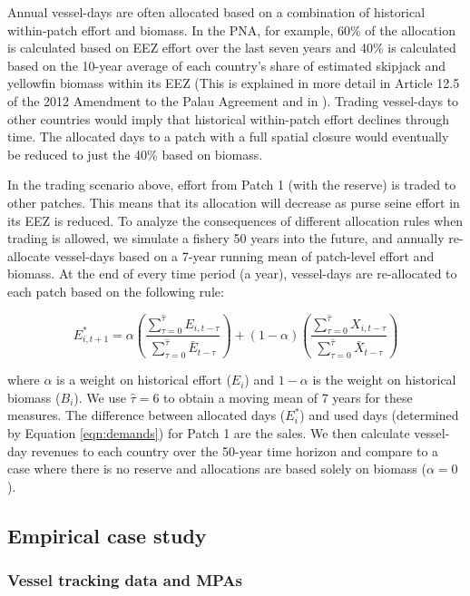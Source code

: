 \documentclass[12pt]{article}
\begin{document}
Annual vessel-days are often allocated based on a combination of historical within-patch effort and biomass. In the PNA, for example, 60\% of the allocation is calculated based on EEZ effort over the last seven years and 40\% is calculated based on the 10-year average of each country’s share of estimated skipjack and yellowfin biomass within its EEZ (This is explained in more detail in Article 12.5 of the 2012 Amendment to the Palau Agreement and in \cite{Hagrannsoknir2014}). Trading vessel-days to other countries would imply that historical within-patch effort declines through time. The allocated days to a patch with a full spatial closure would eventually be reduced to just the 40\% based on biomass.

In the trading scenario above, effort from Patch 1 (with the reserve) is traded to other patches. This means that its allocation will decrease as purse seine effort in its EEZ is reduced. To analyze the consequences of different allocation rules when trading is allowed, we simulate a fishery 50 years into the future, and annually re-allocate vessel-days based on a 7-year running mean of patch-level effort and biomass. At the end of every time period (a year), vessel-days are re-allocated to each patch based on the following rule:

$$
E_{i,t+1}^* = \alpha
\left(\frac{\sum_{\tau = 0}^{\hat{\tau}}E_{i,t-\tau}}{\sum_{\tau = 0}^{\hat{\tau}}\bar{E}_{{t-\tau}}}
	\right)
	+
(1 - \alpha)
\left(\frac{\sum_{\tau = 0}^{\hat{\tau}}X_{i,t-\tau}}{\sum_{\tau = 0}^{\hat{\tau}}\bar{X}_{t-\tau}} \right)
$$

\noindent where $\alpha$ is a weight on historical effort ($E_i$) and $1-\alpha$ is the weight on historical biomass ($B_i$). We use $\hat{\tau}= 6$ to obtain a moving mean of 7 years for these measures. The difference between allocated days ($E_i^*$) and used days (determined by Equation \ref{eqn:demands}) for Patch 1 are the sales. We then calculate vessel-day revenues to each country over the 50-year time horizon and compare to a case where there is no reserve and allocations are based solely on biomass ($\alpha = 0$).

\subsection{Empirical case study}

\subsubsection{Vessel tracking data and MPAs}
\end{document}

